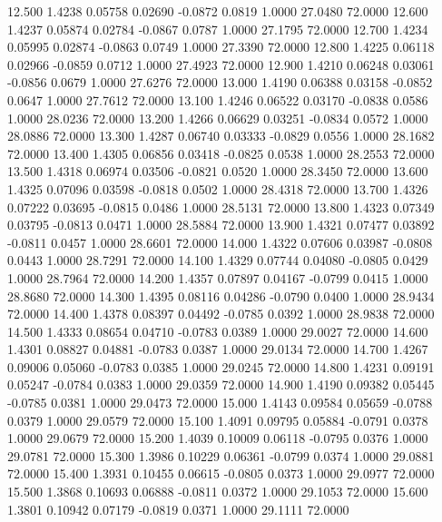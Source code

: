   12.500   1.4238   0.05758   0.02690  -0.0872   0.0819   1.0000  27.0480  72.0000
  12.600   1.4237   0.05874   0.02784  -0.0867   0.0787   1.0000  27.1795  72.0000
  12.700   1.4234   0.05995   0.02874  -0.0863   0.0749   1.0000  27.3390  72.0000
  12.800   1.4225   0.06118   0.02966  -0.0859   0.0712   1.0000  27.4923  72.0000
  12.900   1.4210   0.06248   0.03061  -0.0856   0.0679   1.0000  27.6276  72.0000
  13.000   1.4190   0.06388   0.03158  -0.0852   0.0647   1.0000  27.7612  72.0000
  13.100   1.4246   0.06522   0.03170  -0.0838   0.0586   1.0000  28.0236  72.0000
  13.200   1.4266   0.06629   0.03251  -0.0834   0.0572   1.0000  28.0886  72.0000
  13.300   1.4287   0.06740   0.03333  -0.0829   0.0556   1.0000  28.1682  72.0000
  13.400   1.4305   0.06856   0.03418  -0.0825   0.0538   1.0000  28.2553  72.0000
  13.500   1.4318   0.06974   0.03506  -0.0821   0.0520   1.0000  28.3450  72.0000
  13.600   1.4325   0.07096   0.03598  -0.0818   0.0502   1.0000  28.4318  72.0000
  13.700   1.4326   0.07222   0.03695  -0.0815   0.0486   1.0000  28.5131  72.0000
  13.800   1.4323   0.07349   0.03795  -0.0813   0.0471   1.0000  28.5884  72.0000
  13.900   1.4321   0.07477   0.03892  -0.0811   0.0457   1.0000  28.6601  72.0000
  14.000   1.4322   0.07606   0.03987  -0.0808   0.0443   1.0000  28.7291  72.0000
  14.100   1.4329   0.07744   0.04080  -0.0805   0.0429   1.0000  28.7964  72.0000
  14.200   1.4357   0.07897   0.04167  -0.0799   0.0415   1.0000  28.8680  72.0000
  14.300   1.4395   0.08116   0.04286  -0.0790   0.0400   1.0000  28.9434  72.0000
  14.400   1.4378   0.08397   0.04492  -0.0785   0.0392   1.0000  28.9838  72.0000
  14.500   1.4333   0.08654   0.04710  -0.0783   0.0389   1.0000  29.0027  72.0000
  14.600   1.4301   0.08827   0.04881  -0.0783   0.0387   1.0000  29.0134  72.0000
  14.700   1.4267   0.09006   0.05060  -0.0783   0.0385   1.0000  29.0245  72.0000
  14.800   1.4231   0.09191   0.05247  -0.0784   0.0383   1.0000  29.0359  72.0000
  14.900   1.4190   0.09382   0.05445  -0.0785   0.0381   1.0000  29.0473  72.0000
  15.000   1.4143   0.09584   0.05659  -0.0788   0.0379   1.0000  29.0579  72.0000
  15.100   1.4091   0.09795   0.05884  -0.0791   0.0378   1.0000  29.0679  72.0000
  15.200   1.4039   0.10009   0.06118  -0.0795   0.0376   1.0000  29.0781  72.0000
  15.300   1.3986   0.10229   0.06361  -0.0799   0.0374   1.0000  29.0881  72.0000
  15.400   1.3931   0.10455   0.06615  -0.0805   0.0373   1.0000  29.0977  72.0000
  15.500   1.3868   0.10693   0.06888  -0.0811   0.0372   1.0000  29.1053  72.0000
  15.600   1.3801   0.10942   0.07179  -0.0819   0.0371   1.0000  29.1111  72.0000
